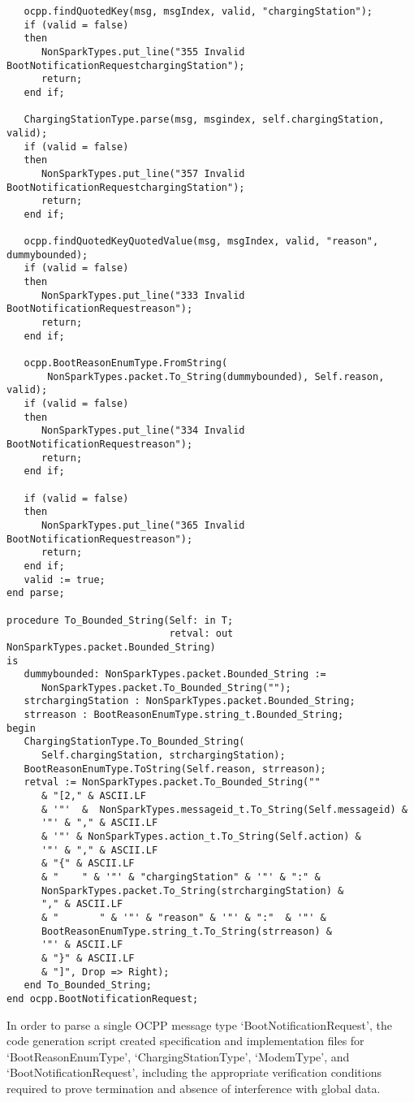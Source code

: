 \documentclass[12pt,openany,a4paper]{book}
\begin{document}
\begin{verbatim}
   ocpp.findQuotedKey(msg, msgIndex, valid, "chargingStation");
   if (valid = false) 
   then 
      NonSparkTypes.put_line("355 Invalid BootNotificationRequestchargingStation"); 
      return; 
   end if;

   ChargingStationType.parse(msg, msgindex, self.chargingStation, valid);
   if (valid = false) 
   then 
      NonSparkTypes.put_line("357 Invalid BootNotificationRequestchargingStation"); 
      return; 
   end if;

   ocpp.findQuotedKeyQuotedValue(msg, msgIndex, valid, "reason", dummybounded);
   if (valid = false) 
   then 
      NonSparkTypes.put_line("333 Invalid BootNotificationRequestreason"); 
      return; 
   end if;

   ocpp.BootReasonEnumType.FromString(
       NonSparkTypes.packet.To_String(dummybounded), Self.reason, valid);
   if (valid = false) 
   then 
      NonSparkTypes.put_line("334 Invalid BootNotificationRequestreason"); 
      return; 
   end if;

   if (valid = false) 
   then 
      NonSparkTypes.put_line("365 Invalid BootNotificationRequestreason"); 
      return; 
   end if;
   valid := true;
end parse;

procedure To_Bounded_String(Self: in T;
                            retval: out NonSparkTypes.packet.Bounded_String)
is
   dummybounded: NonSparkTypes.packet.Bounded_String := 
      NonSparkTypes.packet.To_Bounded_String(""); 
   strchargingStation : NonSparkTypes.packet.Bounded_String;
   strreason : BootReasonEnumType.string_t.Bounded_String;
begin
   ChargingStationType.To_Bounded_String(
      Self.chargingStation, strchargingStation);
   BootReasonEnumType.ToString(Self.reason, strreason);
   retval := NonSparkTypes.packet.To_Bounded_String(""
      & "[2," & ASCII.LF
      & '"'  &  NonSparkTypes.messageid_t.To_String(Self.messageid) & 
      '"' & "," & ASCII.LF
      & '"' & NonSparkTypes.action_t.To_String(Self.action) & 
      '"' & "," & ASCII.LF
      & "{" & ASCII.LF
      & "    " & '"' & "chargingStation" & '"' & ":" & 
      NonSparkTypes.packet.To_String(strchargingStation) & 
      "," & ASCII.LF
      & "       " & '"' & "reason" & '"' & ":"  & '"' & 
      BootReasonEnumType.string_t.To_String(strreason) & 
      '"' & ASCII.LF
      & "}" & ASCII.LF
      & "]", Drop => Right);
   end To_Bounded_String;
end ocpp.BootNotificationRequest;
\end{verbatim}

In order to parse a single OCPP message type `BootNotificationRequest', the code generation script created specification and implementation files for `BootReasonEnumType', `ChargingStationType', `ModemType', and `BootNotificationRequest', including the appropriate verification conditions required to prove termination and absence of interference with global data.
\end{document}
